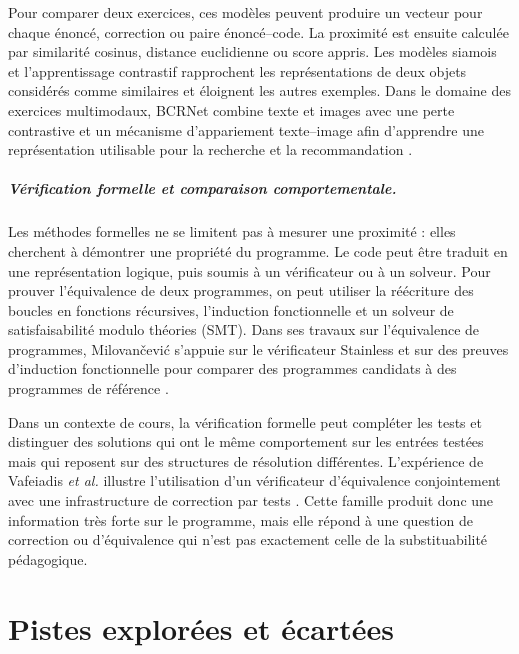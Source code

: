 \documentclass[12pt,a4paper,oneside]{report}
\begin{document}
Pour comparer deux exercices, ces modèles peuvent produire un vecteur pour
chaque énoncé, correction ou paire énoncé--code. La proximité est ensuite
calculée par similarité cosinus, distance euclidienne ou score appris. Les
modèles siamois et l'apprentissage contrastif rapprochent les représentations
de deux objets considérés comme similaires et éloignent les autres exemples.
Dans le domaine des exercices multimodaux, BCRNet combine texte et images
avec une perte contrastive et un mécanisme d'appariement texte--image afin
d'apprendre une représentation utilisable pour la recherche et la
recommandation \cite{mu_2023}.

\paragraph{Vérification formelle et comparaison comportementale.}

Les méthodes formelles ne se limitent pas à mesurer une proximité : elles
cherchent à démontrer une propriété du programme. Le code peut être traduit
en une représentation logique, puis soumis à un vérificateur ou à un
solveur. Pour prouver l'équivalence de deux programmes, on peut utiliser la
réécriture des boucles en fonctions récursives, l'induction fonctionnelle et
un solveur de satisfaisabilité modulo théories (SMT). Dans ses travaux sur
l'équivalence de programmes, Milovančević s'appuie sur le vérificateur
Stainless et sur des preuves d'induction fonctionnelle pour comparer des
programmes candidats à des programmes de référence
\cite{milovancevic_automated_nodate}.

Dans un contexte de cours, la vérification formelle peut compléter les tests
et distinguer des solutions qui ont le même comportement sur les entrées
testées mais qui reposent sur des structures de résolution différentes.
L'expérience de Vafeiadis \emph{et al.} illustre l'utilisation d'un
vérificateur d'équivalence conjointement avec une infrastructure de
correction par tests \cite{vafeiadis_formal_2025}. Cette famille produit donc
une information très forte sur le programme, mais elle répond à une question
de correction ou d'équivalence qui n'est pas exactement celle de la
substituabilité pédagogique.




\chapter{Pistes explorées et écartées}
\label{chap:pistes}
\end{document}
